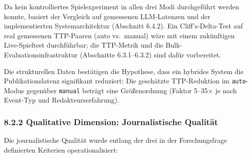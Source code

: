 Da kein kontrolliertes Spielexperiment in allen drei Modi durchgeführt
werden konnte, basiert der Vergleich auf gemessenen LLM-Latenzen und der
implementierten Systemarchitektur (Abschnitt 6.4.2). Ein
Cliff's-Delta-Test auf real gemessenen TTP-Paaren (auto vs.~manual) wäre
mit einem zukünftigen Live-Spieltest durchführbar; die TTP-Metrik und
die Bulk-Evaluationsinfrastruktur (Abschnitte 6.3.1--6.3.2) sind dafür
vorbereitet.

Die strukturellen Daten bestätigen die Hypothese, dass ein hybrides
System die Publikationslatenz signifikant reduziert: Die geschätzte
TTP-Reduktion im \passthrough{\lstinline!auto!}-Modus gegenüber
\passthrough{\lstinline!manual!} beträgt eine Größenordnung (Faktor
5--35× je nach Event-Typ und Redakteurserfahrung).

\subsubsection{8.2.2 Qualitative Dimension: Journalistische
Qualität}\label{qualitative-dimension-journalistische-qualituxe4t}

Die journalistische Qualität wurde entlang der drei in der
Forschungsfrage definierten Kriterien operationalisiert:

